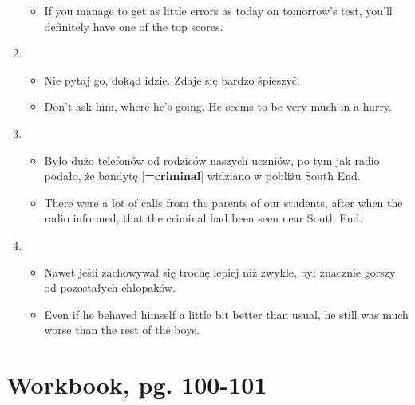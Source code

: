 \documentclass[a4paper]{article}
\begin{document}
\begin{enumerate}
\begin{itemize}
        \item If you manage to get as little errors as today on tomorrow's test, you'll definitely have one of the top scores.
    \end{itemize}
    \item \begin{itemize}
        \item Nie pytaj go, dokąd idzie. Zdaje się bardzo śpieszyć.
        \item Don't ask him, where he's going. He seems to be very much in a hurry.
    \end{itemize}
    \item \begin{itemize}
        \item Było dużo telefonów od rodziców naszych uczniów, po tym jak radio podało, że bandytę [{\bf=criminal}] widziano w pobliżu South End.
        \item There were a lot of calls from the parents of our students, after when the radio informed, that the criminal had been seen near South End.
    \end{itemize}
    \item \begin{itemize}
        \item Nawet jeśli zachowywał się trochę lepiej niż zwykle, był znacznie gorszy od pozostałych chłopaków.
        \item Even if he behaved himself a little bit better than usual, he still was much worse than the rest of the boys.
    \end{itemize}
\end{enumerate}
\section{Workbook, pg. 100-101}
\end{document}
